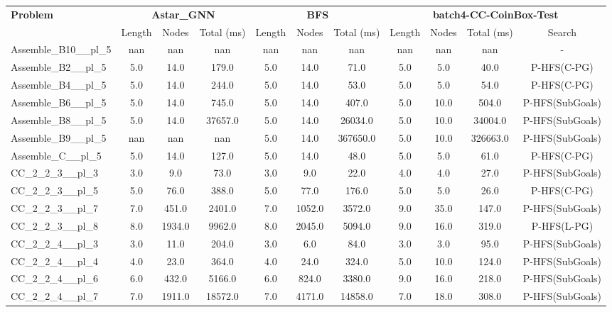 \begin{table}[!ht]
\centering
\scriptsize
\begin{tabular}{l|ccc|ccc|cccc}
\multirow{2}{*}{\textbf{Problem}} & \multicolumn{3}{c|}{\textbf{Astar\_GNN}} & \multicolumn{3}{c|}{\textbf{BFS}} & \multicolumn{4}{c}{\textbf{batch4-CC-CoinBox-Test}} \\
\cline{2-11}
& Length & Nodes & Total (ms) & Length & Nodes & Total (ms) & Length & Nodes & Total (ms) & Search \\
\hline
Assemble\_B10\_\_pl\_5 & nan & nan & nan & nan & nan & nan & nan & nan & nan & - \\
Assemble\_B2\_\_pl\_5 & 5.0 & 14.0 & 179.0 & 5.0 & 14.0 & 71.0 & 5.0 & 5.0 & 40.0 & P-HFS(C-PG) \\
Assemble\_B4\_\_pl\_5 & 5.0 & 14.0 & 244.0 & 5.0 & 14.0 & 53.0 & 5.0 & 5.0 & 54.0 & P-HFS(C-PG) \\
Assemble\_B6\_\_pl\_5 & 5.0 & 14.0 & 745.0 & 5.0 & 14.0 & 407.0 & 5.0 & 10.0 & 504.0 & P-HFS(SubGoals) \\
Assemble\_B8\_\_pl\_5 & 5.0 & 14.0 & 37657.0 & 5.0 & 14.0 & 26034.0 & 5.0 & 10.0 & 34004.0 & P-HFS(SubGoals) \\
Assemble\_B9\_\_pl\_5 & nan & nan & nan & 5.0 & 14.0 & 367650.0 & 5.0 & 10.0 & 326663.0 & P-HFS(SubGoals) \\
Assemble\_C\_\_pl\_5 & 5.0 & 14.0 & 127.0 & 5.0 & 14.0 & 48.0 & 5.0 & 5.0 & 61.0 & P-HFS(C-PG) \\
CC\_2\_2\_3\_\_pl\_3 & 3.0 & 9.0 & 73.0 & 3.0 & 9.0 & 22.0 & 4.0 & 4.0 & 27.0 & P-HFS(SubGoals) \\
CC\_2\_2\_3\_\_pl\_5 & 5.0 & 76.0 & 388.0 & 5.0 & 77.0 & 176.0 & 5.0 & 5.0 & 26.0 & P-HFS(C-PG) \\
CC\_2\_2\_3\_\_pl\_7 & 7.0 & 451.0 & 2401.0 & 7.0 & 1052.0 & 3572.0 & 9.0 & 35.0 & 147.0 & P-HFS(SubGoals) \\
CC\_2\_2\_3\_\_pl\_8 & 8.0 & 1934.0 & 9962.0 & 8.0 & 2045.0 & 5094.0 & 9.0 & 16.0 & 319.0 & P-HFS(L-PG) \\
CC\_2\_2\_4\_\_pl\_3 & 3.0 & 11.0 & 204.0 & 3.0 & 6.0 & 84.0 & 3.0 & 3.0 & 95.0 & P-HFS(SubGoals) \\
CC\_2\_2\_4\_\_pl\_4 & 4.0 & 23.0 & 364.0 & 4.0 & 24.0 & 324.0 & 5.0 & 10.0 & 124.0 & P-HFS(SubGoals) \\
CC\_2\_2\_4\_\_pl\_6 & 6.0 & 432.0 & 5166.0 & 6.0 & 824.0 & 3380.0 & 9.0 & 16.0 & 218.0 & P-HFS(SubGoals) \\
CC\_2\_2\_4\_\_pl\_7 & 7.0 & 1911.0 & 18572.0 & 7.0 & 4171.0 & 14858.0 & 7.0 & 18.0 & 308.0 & P-HFS(SubGoals) \\

\end{tabular}
\end{table}
